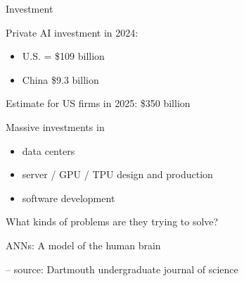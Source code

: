 \begin{frame}{Investment}

    Private AI investment in 2024:

    \begin{itemize}
        \item U.S. = \$109 billion 
        \vspace{0.5em}
        \item China \$9.3 billion 
    \end{itemize}

        \vspace{0.5em}
    Estimate for US firms in 2025: \$350 billion

        \vspace{0.5em}
    Massive investments in 

    \begin{itemize}
        \item data centers
        \vspace{0.5em}
        \item server / GPU / TPU design and production
        \vspace{0.5em}
        \item software development
    \end{itemize}

\end{frame}


\begin{frame}
    
    What kinds of problems are they trying to solve?

\end{frame}



\begin{frame}{ANNs: A model of the human brain}
    
    \begin{figure}
       \centering
    \end{figure}

    \footnotesize{
    \hspace{5em} -- source: Dartmouth undergraduate journal of science}

\end{frame}


